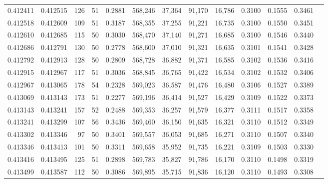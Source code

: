 \begin{tabular}{rrrrrrrrrrrrr}
0.412411 & 0.412515 &   126 &  51 &                                     0.2881 & 568,246 &  37,364 &  91,170 &  16,786 & 0.3100 & 0.1555 & 0.3461 \\
0.412518 & 0.412609 &   109 &  51 &                                     0.3187 & 568,355 &  37,255 &  91,221 &  16,735 & 0.3100 & 0.1550 & 0.3451 \\
0.412610 & 0.412685 &   115 &  50 &                                     0.3030 & 568,470 &  37,140 &  91,271 &  16,685 & 0.3100 & 0.1546 & 0.3440 \\
0.412686 & 0.412791 &   130 &  50 &                                     0.2778 & 568,600 &  37,010 &  91,321 &  16,635 & 0.3101 & 0.1541 & 0.3428 \\
0.412792 & 0.412913 &   128 &  50 &                                     0.2809 & 568,728 &  36,882 &  91,371 &  16,585 & 0.3102 & 0.1536 & 0.3416 \\
0.412915 & 0.412967 &   117 &  51 &                                     0.3036 & 568,845 &  36,765 &  91,422 &  16,534 & 0.3102 & 0.1532 & 0.3406 \\
0.412967 & 0.413065 &   178 &  54 &                                     0.2328 & 569,023 &  36,587 &  91,476 &  16,480 & 0.3106 & 0.1527 & 0.3389 \\
0.413069 & 0.413143 &   173 &  51 &                                     0.2277 & 569,196 &  36,414 &  91,527 &  16,429 & 0.3109 & 0.1522 & 0.3373 \\
0.413143 & 0.413241 &   157 &  52 &                                     0.2488 & 569,353 &  36,257 &  91,579 &  16,377 & 0.3111 & 0.1517 & 0.3358 \\
0.413241 & 0.413299 &   107 &  56 &                                     0.3436 & 569,460 &  36,150 &  91,635 &  16,321 & 0.3110 & 0.1512 & 0.3349 \\
0.413302 & 0.413346 &    97 &  50 &                                     0.3401 & 569,557 &  36,053 &  91,685 &  16,271 & 0.3110 & 0.1507 & 0.3340 \\
0.413346 & 0.413413 &   101 &  50 &                                     0.3311 & 569,658 &  35,952 &  91,735 &  16,221 & 0.3109 & 0.1503 & 0.3330 \\
0.413416 & 0.413495 &   125 &  51 &                                     0.2898 & 569,783 &  35,827 &  91,786 &  16,170 & 0.3110 & 0.1498 & 0.3319 \\
0.413499 & 0.413587 &   112 &  50 &                                     0.3086 & 569,895 &  35,715 &  91,836 &  16,120 & 0.3110 & 0.1493 & 0.3308 \\

\end{tabular}

